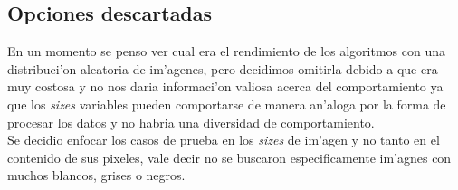    



\subsection{Opciones descartadas}
En un momento se penso ver cual era el rendimiento de los algoritmos con una distribuci'on 
aleatoria de im'agenes, pero decidimos omitirla debido a que era muy costosa y no nos 
daria informaci'on valiosa acerca del comportamiento ya que los \textit{sizes} variables pueden comportarse 
de manera an'aloga por la forma de procesar los datos y no habria una diversidad de comportamiento.\\
Se decidio enfocar los casos de prueba en los \textit{sizes} de im'agen y no tanto en el contenido de 
sus pixeles, vale decir no se buscaron especificamente im'agnes con muchos blancos, grises o negros.   


